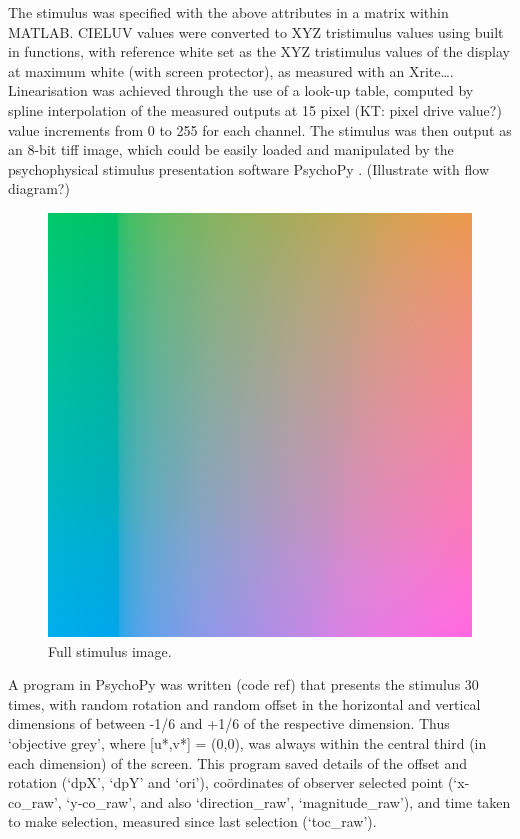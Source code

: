 The stimulus was specified with the above attributes in a matrix within MATLAB. CIELUV values were converted to XYZ tristimulus values using built in functions, with reference white set as the XYZ tristimulus values of the display at maximum white (with screen protector), as measured with an Xrite…. Linearisation was achieved through the use of a look-up table, computed by spline interpolation of the measured outputs at 15 pixel (KT: pixel drive value?) value increments from 0 to 255 for each channel. The stimulus was then output as an 8-bit tiff image, which could be easily loaded and manipulated by the psychophysical stimulus presentation software PsychoPy \citep{peirce_psychopypsychophysics_2007}. (Illustrate with flow diagram?)

\begin{figure}[hbp]
\includegraphics[width=\textwidth]{figs/tablet/stimulus.png}
\caption{Full stimulus image.}
\label{fig:Stimulus}
\end{figure}

A program in PsychoPy was written (code ref) that presents the stimulus 30 times, with random rotation and random offset in the horizontal and vertical dimensions of between -1/6 and +1/6 of the respective dimension. Thus ‘objective grey’, where [u*,v*] = (0,0), was always within the central third (in each dimension) of the screen. This program saved details of the offset and rotation (‘dpX’, ‘dpY’ and ‘ori’), coördinates of observer selected point (‘x-co_raw’, ‘y-co_raw’, and also ‘direction_raw’, ‘magnitude_raw’), and time taken to make selection, measured since last selection (‘toc_raw’).

